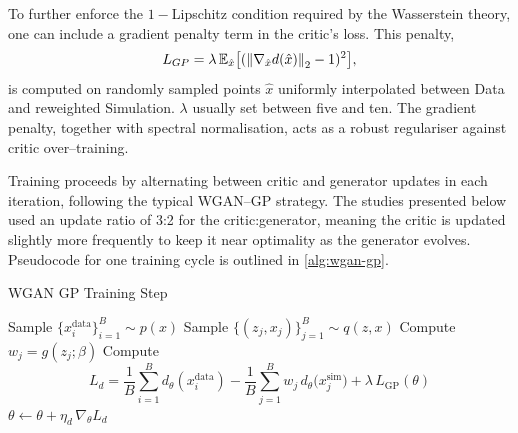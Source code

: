 {{        To further enforce the \(1-\)Lipschitz condition required by the Wasserstein theory, one can include a gradient penalty term in the critic’s loss.
        This penalty,
        \[
            L_{GP} = \lambda\,\mathbb{E}_{\hat{x}}\qty[(\norm{\nabla_{\hat{x}}d(\hat{x})}_2 - 1)^2],
        \]
        is computed on randomly sampled points $\hat{x}$ uniformly interpolated between Data and reweighted Simulation.
        $\lambda$ usually set between five and ten.
        The gradient penalty, together with spectral normalisation, acts as a robust regulariser against critic over--training.

        Training proceeds by alternating between critic and generator updates in each iteration, following the typical WGAN--GP strategy.
        The studies presented below used an update ratio of 3:2 for the critic:generator, meaning the critic is updated slightly more frequently to keep it near optimality as the generator evolves.
        Pseudocode for one training cycle is outlined in \cref{alg:wgan-gp}.

        \begin{algorithm}
            \caption{WGAN GP Training Step}
            \label{alg:wgan-gp}
                \State Sample $\{x_i^{\text{data}}\}_{i=1}^B\sim p(x)$
                \State Sample $\{(z_j, x_j)\}_{j=1}^B\sim q(z, x)$
                \State Compute $w_j = g(z_j;\beta)$
                \State Compute
                \[
                  L_d
                  = \frac1B\sum_{i=1}^B d_{\theta}(x_i^{\text{data}})
                    -\frac1B\sum_{j=1}^B w_j\,d_{\theta}\bigl(x^{\text{sim}}_j\bigr)
                    +\lambda\,L_{\text{GP}}(\theta)
                \]
                \State $\theta \leftarrow\theta + \eta_d\,\nabla_{\theta}L_d$    
              \EndFor
            

\end{algorithm}}}
